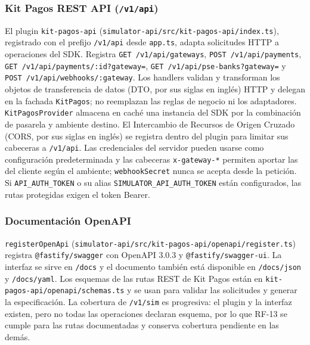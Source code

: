 \subsubsection{Kit Pagos REST API (\texttt{/v1/api})}
El plugin \texttt{kit-pagos-api} (\texttt{simulator-api/src/kit-pagos-api/index.ts}), registrado con el prefijo \texttt{/v1/api} desde \texttt{app.ts}, adapta solicitudes HTTP a operaciones del SDK. Registra \texttt{GET /v1/api/gateways}, \texttt{POST /v1/api/payments}, \texttt{GET /v1/api/payments/:id?gateway=}, \texttt{GET /v1/api/pse-banks?gateway=} y \texttt{POST /v1/api/webhooks/:gateway}. Los handlers validan y transforman los objetos de transferencia de datos (DTO, por sus siglas en inglés) HTTP y delegan en la fachada \texttt{KitPagos}; no reemplazan las reglas de negocio ni los adaptadores. \texttt{KitPagosProvider} almacena en caché una instancia del SDK por la combinación de pasarela y ambiente destino. El Intercambio de Recursos de Origen Cruzado (CORS, por sus siglas en inglés) se registra dentro del plugin para limitar sus cabeceras a \texttt{/v1/api}. Las credenciales del servidor pueden usarse como configuración predeterminada y las cabeceras \texttt{x-gateway-*} permiten aportar las del cliente según el ambiente; \texttt{webhookSecret} nunca se acepta desde la petición. Si \texttt{API\_AUTH\_TOKEN} o su alias \texttt{SIMULATOR\_API\_AUTH\_TOKEN} están configurados, las rutas protegidas exigen el token Bearer.

\subsubsection{Documentación OpenAPI}
\texttt{registerOpenApi} (\texttt{simulator-api/\allowbreak{}src/\allowbreak{}kit-pagos-api/\allowbreak{}openapi/\allowbreak{}register.ts}) registra \texttt{@fastify/\allowbreak{}swagger} con OpenAPI 3.0.3 y \texttt{@fastify/\allowbreak{}swagger-ui}. La interfaz se sirve en \texttt{/\allowbreak{}docs} y el documento también está disponible en \texttt{/\allowbreak{}docs/\allowbreak{}json} y \texttt{/\allowbreak{}docs/\allowbreak{}yaml}. Los esquemas de las rutas REST de Kit Pagos están en \texttt{kit-pagos-api/\allowbreak{}openapi/\allowbreak{}schemas.ts} y se usan para validar las solicitudes y generar la especificación. La cobertura de \texttt{/\allowbreak{}v1/\allowbreak{}sim} es progresiva: el plugin y la interfaz existen, pero no todas las operaciones declaran esquema, por lo que RF-13 se cumple para las rutas documentadas y conserva cobertura pendiente en las demás.

